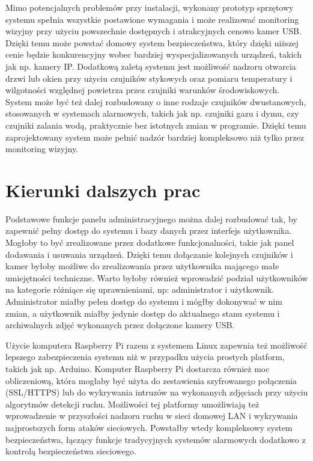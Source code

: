 \documentclass[a4paper,11pt,twoside]{article}
\begin{document}
Mimo potencjalnych problemów przy instalacji, wykonany prototyp sprzętowy systemu spełnia wszystkie postawione wymagania i może realizować monitoring wizyjny przy użyciu powszechnie dostępnych i atrakcyjnych cenowo kamer USB. Dzięki temu może powstać domowy system bezpieczeństwa, który dzięki niższej cenie będzie konkurencyjny wobec bardziej wyspecjalizowanych urządzeń, takich jak np. kamery IP. Dodatkową zaletą systemu jest możliwość nadzoru otwarcia drzwi lub okien przy użyciu czujników stykowych oraz pomiaru temperatury i wilgotności względnej powietrza przez czujniki warunków środowiskowych. System może być też dalej rozbudowany o inne rodzaje czujników dwustanowych, stosowanych w systemach alarmowych, takich jak np. czujniki gazu i dymu, czy czujniki zalania wodą, praktycznie bez istotnych zmian w programie. Dzięki temu zaprojektowany system może pełnić nadzór bardziej kompleksowo niż tylko przez monitoring wizyjny.

\section{Kierunki dalszych prac}

Podstawowe funkcje panelu administracyjnego można dalej rozbudować tak, by zapewnić pełny dostęp do systemu i bazy danych przez interfejs użytkownika. Mogłoby to być zrealizowane przez dodatkowe funkcjonalności, takie jak panel dodawania i usuwania urządzeń. Dzięki temu dołączanie kolejnych czujników i kamer byłoby możliwe do zrealizowania przez użytkownika mającego małe umiejętności techniczne. Warto byłoby również wprowadzić podział użytkowników na kategorie różniące się uprawnieniami, np: administrator i użytkownik. Administrator miałby pełen dostęp do systemu i mógłby dokonywać w nim zmian, a użytkownik miałby jedynie dostęp do aktualnego stanu systemu i archiwalnych zdjęć wykonanych przez dołączone kamery USB.

Użycie komputera Raspberry Pi razem z systemem Linux zapewnia też możliwość lepszego zabezpieczenia systemu niż w przypadku użycia prostych platform, takich jak np. Arduino. Komputer Raspberry Pi dostarcza również moc obliczeniową, która mogłaby być użyta do zestawienia szyfrowanego połączenia (SSL/HTTPS) lub do wykrywania intruzów na wykonanych zdjęciach przy użyciu algorytmów detekcji ruchu. Możliwości tej platformy umożliwiają też wprowadzenie w przyszłości nadzoru ruchu w sieci domowej LAN i wykrywania najprostszych form ataków sieciowych. Powstałby wtedy kompleksowy system bezpieczeństwa, łączący funkcje tradycyjnych systemów alarmowych dodatkowo z kontrolą bezpieczeństwa sieciowego.
\end{document}

